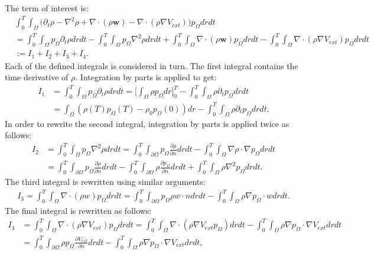 The term of interest is:
\begin{align*}
 &\int_0^T \int_\Omega \bigg( \partial_t \rho - \nabla^2 \rho + \nabla \cdot (\rho \mathbf{w}) - \nabla \cdot (\rho \nabla V_{ext}) \bigg) p_\Omega dr dt \\
 &=   \int_0^T \int_\Omega   p_\Omega \partial_t \rho dr dt -\int_0^T  \int_\Omega  p_\Omega \nabla^2 \rho dr dt  + \int_0^T \int_\Omega \nabla \cdot (\rho \mathbf{w}) p_\Omega dr dt -\int_0^T \int_\Omega \nabla \cdot (\rho \nabla V_{ext})p_\Omega dr dt \\
 &:= I_1 + I_2 + I_3 + I_4. 
\end{align*}
Each of the defined integrals is considered in turn.
The first integral contains the time derivative of $\rho$. Integration by parts is applied to get:
\begin{align*}
I_1&=\int_0^T \int_\Omega  p_\Omega \partial_t \rho dr dt  = \bigg[ \int_\Omega \rho p_\Omega dr \bigg]_0^T - \int_0^T \int_\Omega \rho\partial_t  p_\Omega dr dt\\
&= \int_\Omega (\rho(T) p_\Omega(T) -\rho_0 p_\Omega(0))dr  - \int_0^T \int_\Omega \rho\partial_t  p_\Omega dr dt .
\end{align*}
In order to rewrite the second integral, integration by parts is applied twice as follows:
\begin{align*}
I_2&=  \int_0^T \int_\Omega p_\Omega \nabla^2 \rho dr dt  
=\int_0^T \int_{\partial \Omega}  p_\Omega \frac{\partial \rho}{\partial {n}} dr dt  -\int_0^T \int_\Omega  \nabla \rho \cdot \nabla p_\Omega dr dt \\
&=\int_0^T \int_{\partial \Omega}  p_\Omega \frac{\partial \rho}{\partial n} dr dt - \int_0^T \int_{\partial \Omega}  \rho \frac{\partial p_\Omega }{\partial {n}} dr dt   +\int_0^T \int_\Omega \rho \nabla^2 p_\Omega dr dt .
\end{align*} 
The third integral is rewritten using similar arguments:
\begin{align*}
I_3 = \int_0^T \int_\Omega \nabla \cdot (\rho w) p_\Omega dr dt = \int_0^T  \int_{\partial \Omega}  p_\Omega \rho w \cdot n dr dt  - \int_0^T \int_\Omega \rho \nabla p_\Omega \cdot w dr dt.
\end{align*}
The final integral is rewritten as follows:
\begin{align*}
I_4 &=\int_0^T \int_\Omega \nabla \cdot (\rho \nabla V_{ext})p_\Omega dr dt=\int_0^T \int_\Omega \nabla \cdot (\rho \nabla V_{ext}p_\Omega) dr dt  - \int_0^T \int_\Omega  \rho \nabla p_\Omega\cdot \nabla V_{ext} dr dt\\
&= \int_0^T \int_{\partial\Omega}  \rho p_\Omega \frac{\partial V_{ext}}{\partial n} dr dt - \int_0^T \int_\Omega  \rho \nabla p_\Omega\cdot \nabla V_{ext} dr dt,
\end{align*}
